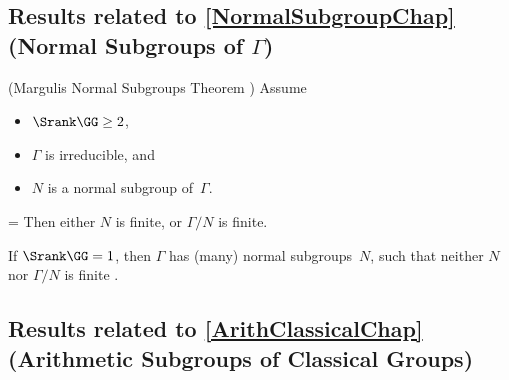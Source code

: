 \subsection*{Results related to \cref{NormalSubgroupChap} (Normal Subgroups of $\Gamma$)}

	\begin{slist}
	 (Margulis Normal Subgroups Theorem \cite[Thm.~VIII.2.6, p.~265]{MargulisBook})
	Assume 
		\begin{itemize} \parindent %
		\item $\Srank \GG \ge 2$,
		\item $\Gamma$ is irreducible,
		and
		\item $N$ is a normal subgroup of~$\Gamma$.
		\end{itemize}
\leftskip=\sindent %
	Then either $N$ is finite, or $\Gamma/N$ is finite.

\leftskip=0pt %

	If $\Srank \GG = 1$, then $\Gamma$ has (many) normal subgroups~$N$, such that neither $N$ nor $\Gamma/N$ is finite
		 \cite[Cor.~7.6]{Lubotzky-LattRank1LocalFlds}.
	\end{slist}




\subsection*{Results related to \cref{ArithClassicalChap} (Arithmetic Subgroups of Classical Groups)}

